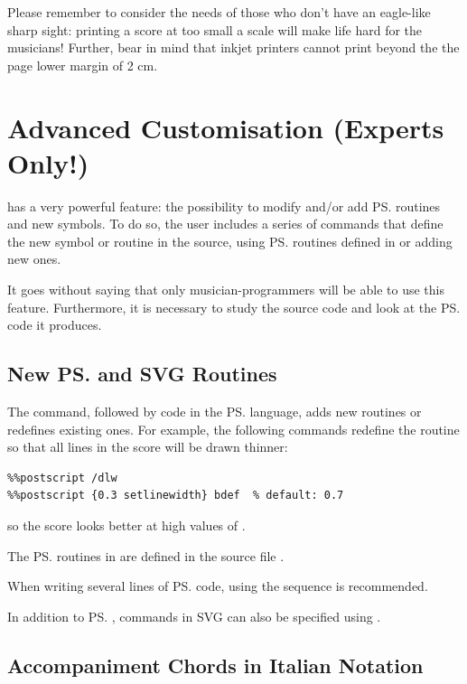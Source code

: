 \documentclass[a4paper,12pt]{book}
\begin{document}
Please remember to consider the needs of those who don't have an
eagle-like sharp sight: printing a score at too small a scale will
make life hard for the musicians! Further, bear in mind that inkjet
printers cannot print beyond the the page lower margin of 2 cm.


\section{Advanced Customisation (Experts Only!)}
\label{sec:decopers}

\abcm{} has a very powerful feature: the possibility to modify and/or
add \ps{} routines and new symbols. To do so, the user includes a
series of commands that define the new symbol or routine in the
source, using \ps{} routines defined in \abcm{} or adding new ones.

It goes without saying that only musician-programmers will be able to
use this feature. Furthermore, it is necessary to study the \abcm{}
source code and look at the \ps{} code it produces.


\subsection{New \ps{} and SVG Routines}
\label{sec:customps}

The  command, followed by code in the \ps{}
language, adds new routines or redefines existing ones. For example,
the following commands redefine the routine  so that all
lines in the score will be drawn thinner:

\begin{verbatim}
%%postscript /dlw
%%postscript {0.3 setlinewidth} bdef  % default: 0.7
\end{verbatim}

so the score looks better at high values of .

The \ps{} routines in \abcm{} are defined in the \abcm{} source file
.

When writing several lines of \ps{} code, using the sequence
  is recommended.

In addition to \ps{}, commands in SVG can also be specified using
 .


\subsection{Accompaniment Chords in Italian Notation}
\label{sec:itachords}
\end{document}
